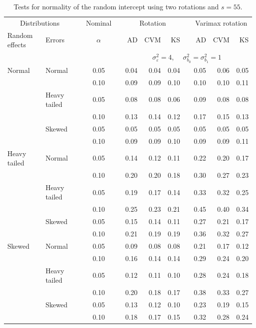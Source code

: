\documentclass[12pt]{article} %
\begin{document}
\begin{table}[ht]
\caption{Tests for normality of the random intercept using two rotations and $s = 55$.}
\begin{scriptsize}
\begin{center}
\begin{tabular}{ll p{.1cm} c p{.1cm} rrr p{.1cm} rrr}
  \hline
  \multicolumn{2}{c}{Distributions}& & Nominal & &  \multicolumn{3}{c}{Rotation} & & \multicolumn{3}{c}{Varimax rotation} \\ \cline{1-2} \cline{6-8} \cline{10-12}   
  Random effects & Errors & & $\alpha$ & & AD & CVM & KS & & AD & CVM & KS \\ 
   \hline
& && && \multicolumn{7}{c}{$\sigma_{\varepsilon}^2 = 4$, \ \ $\sigma_{b_0}^2 = \sigma_{b_1}^2 = 1$} \\ \cline{6-12}
Normal       & Normal       && 0.05 &&   0.04 & 0.04 & 0.04 && 0.05 & 0.06 & 0.05 \\ 
             &              && 0.10 &&   0.09 & 0.09 & 0.10 && 0.10 & 0.10 & 0.11 \\ 
             & Heavy tailed && 0.05 &&   0.08 & 0.08 & 0.06 && 0.09 & 0.08 & 0.08 \\ 
             &              && 0.10 &&   0.13 & 0.14 & 0.12 && 0.17 & 0.15 & 0.13 \\ 
             & Skewed       && 0.05 &&   0.05 & 0.05 & 0.05 && 0.05 & 0.05 & 0.05 \\ 
             &              && 0.10 &&   0.09 & 0.09 & 0.10 && 0.09 & 0.09 & 0.11 \\ 
Heavy tailed & Normal       && 0.05 &&   0.14 & 0.12 & 0.11 && 0.22 & 0.20 & 0.17 \\ 
             &              && 0.10 &&   0.20 & 0.20 & 0.18 && 0.30 & 0.27 & 0.23 \\ 
             & Heavy tailed && 0.05 &&   0.19 & 0.17 & 0.14 && 0.33 & 0.32 & 0.25 \\ 
             &              && 0.10 &&   0.25 & 0.23 & 0.21 && 0.45 & 0.40 & 0.34 \\ 
             & Skewed       && 0.05 &&   0.15 & 0.14 & 0.11 && 0.27 & 0.21 & 0.17 \\ 
             &              && 0.10 &&   0.21 & 0.19 & 0.19 && 0.36 & 0.32 & 0.27 \\ 
Skewed       & Normal       && 0.05 &&   0.09 & 0.08 & 0.08 && 0.21 & 0.17 & 0.12 \\ 
             &              && 0.10 &&   0.16 & 0.14 & 0.14 && 0.29 & 0.24 & 0.20 \\ 
             & Heavy tailed && 0.05 &&   0.12 & 0.11 & 0.10 && 0.28 & 0.24 & 0.18 \\ 
             &              && 0.10 &&   0.20 & 0.18 & 0.17 && 0.38 & 0.33 & 0.27 \\ 
             & Skewed       && 0.05 &&   0.13 & 0.12 & 0.10 && 0.23 & 0.19 & 0.15 \\ 
             &              && 0.10 &&   0.18 & 0.17 & 0.15 && 0.32 & 0.28 & 0.24 \\ 


\end{tabular}
\end{center}
\end{scriptsize}
\end{table}
\end{document}
